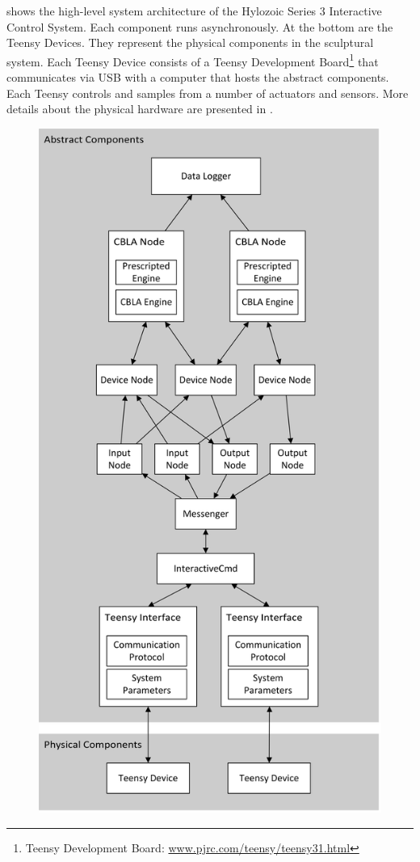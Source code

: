  shows the high-level system architecture of the Hylozoic Series 3 Interactive Control System. Each component runs asynchronously. At the bottom are the Teensy Devices. They represent the physical components in the sculptural system. Each Teensy Device consists of a Teensy Development Board\footnote{Teensy Development Board: \url{www.pjrc.com/teensy/teensy31.html}} that communicates via USB with a computer that hosts the abstract components. Each Teensy controls and samples from a number of actuators and sensors. More details about the physical hardware are presented in . 

\begin{figure} [!htbp]
	\centering
	\includegraphics[height=0.90 \textheight]{"fig/interactive control system/high-level system architecture"}

\end{figure}
